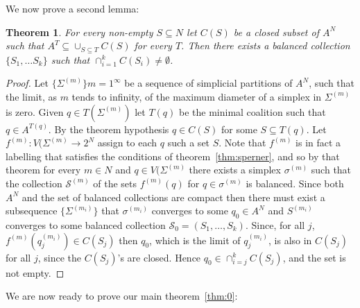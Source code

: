 \documentclass[11pt]{article} \usepackage{amssymb}
\newtheorem{theorem}{Theorem}[section]
\begin{document}
We now prove a second lemma:
\begin{theorem}
  For every non-empty $S \subseteq N$ let $C(S)$ be a closed subset of
  $A^N$ such that $A^T \subseteq \cup_{S \subseteq T}C(S)$ for every $T$.
  Then there exists a balanced collection $\{S_1, \ldots S_k\}$ such
  that $\cap_{i=1}^kC(S_i) \neq \emptyset$.
\end{theorem}
\begin{proof}
  Let $\{\Sigma^{(m)}\}{m=1}^\infty$ be a sequence of simplicial
  partitions of $A^N$, such that the limit, as $m$ tends to infinity,
  of the maximum diameter of a simplex in $\Sigma^{(m)}$ is
  zero. Given $q \in T(\Sigma^{(m)})$ let $T(q)$ be the minimal
  coalition such that $q \in A^{T(q)}$. By the theorem hypothesis $q
  \in C(S)$ for some $S \subseteq T(q)$. Let $f^{(m)}:V(\Sigma^{(m)}
  \to 2^N$ assign to each $q$ such a set $S$. Note that $f^{(m)}$ is
  in fact a labelling that satisfies the conditions of
  theorem~\ref{thm:sperner}, and so by that theorem for every $m \in
  N$ and $q \in V(\Sigma^{(m)}$ there exists a simplex $\sigma^{(m)}$
  such that the collection $\mathcal{S}^{(m)}$ of the sets
  $f^{(m)}(q)$ for $q \in \sigma^{(m)}$ is balanced. Since both $A^N$
  and the set of balanced collections are compact then there must
  exist a subsequence $\{\Sigma^{(m_i)}\}$ that $\sigma^{(m_i)}$
  converges to some $q_0 \in A^N$ and $S^{(m_i)}$ converges to some
  balanced collection $\mathcal{S}_0=(S_1,\ldots,S_k)$. Since, for all
  $j$, $f^{(m)}(q_j^{(m_i)}) \in C(S_j)$ then $q_0$, which is the
  limit of $q_j^{(m_i)}$, is also in $C(S_j)$ for all $j$, since the
  $C(S_j)$'s are closed. Hence $q_0 \in \cap_{i=j}^kC(S_j)$, and the
  set is not empty.
\end{proof}

We are now ready to prove our main theorem~\ref{thm:0}:

 


 
\end{document}
